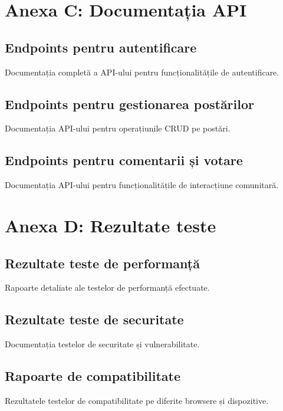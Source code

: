 \documentclass[12pt,a4paper]{report}
\begin{document}
\section*{Anexa C: Documentația API}

\subsection*{Endpoints pentru autentificare}

Documentația completă a API-ului pentru funcționalitățile de autentificare.

\subsection*{Endpoints pentru gestionarea postărilor}

Documentația API-ului pentru operațiunile CRUD pe postări.

\subsection*{Endpoints pentru comentarii și votare}

Documentația API-ului pentru funcționalitățile de interacțiune comunitară.

\section*{Anexa D: Rezultate teste}

\subsection*{Rezultate teste de performanță}

Rapoarte detaliate ale testelor de performanță efectuate.

\subsection*{Rezultate teste de securitate}

Documentația testelor de securitate și vulnerabilitate.

\subsection*{Rapoarte de compatibilitate}

Rezultatele testelor de compatibilitate pe diferite browsere și dispozitive.
\end{document}
